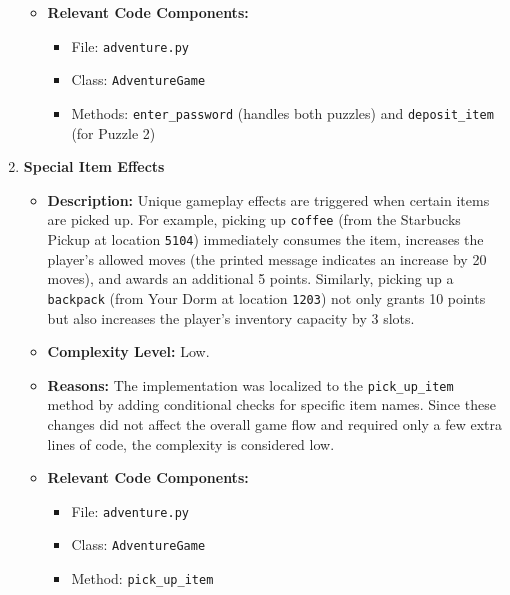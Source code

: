 \documentclass[11pt]{article}
\begin{document}
\begin{enumerate}
\begin{itemize}
\begin{itemize}
        \end{itemize}
        \item \textbf{Relevant Code Components:}  
        \begin{itemize}
            \item File: \texttt{adventure.py}
            \item Class: \texttt{AdventureGame}
            \item Methods: \texttt{enter\_password} (handles both puzzles) and \texttt{deposit\_item} (for Puzzle 2)
        \end{itemize}
    \end{itemize}
    
    \item \textbf{Special Item Effects}
    \begin{itemize}
        \item \textbf{Description:}  
        Unique gameplay effects are triggered when certain items are picked up. For example, picking up \texttt{coffee} (from the Starbucks Pickup at location \texttt{5104}) immediately consumes the item, increases the player’s allowed moves (the printed message indicates an increase by 20 moves), and awards an additional 5 points. Similarly, picking up a \texttt{backpack} (from Your Dorm at location \texttt{1203}) not only grants 10 points but also increases the player's inventory capacity by 3 slots.
        \item \textbf{Complexity Level:} Low.
        \item \textbf{Reasons:}  
        The implementation was localized to the \texttt{pick\_up\_item} method by adding conditional checks for specific item names. Since these changes did not affect the overall game flow and required only a few extra lines of code, the complexity is considered low.
        \item \textbf{Relevant Code Components:}  
        \begin{itemize}
            \item File: \texttt{adventure.py}
            \item Class: \texttt{AdventureGame}
            \item Method: \texttt{pick\_up\_item}
        \end{itemize}
    \end{itemize}
    

\end{enumerate}
\end{document}
